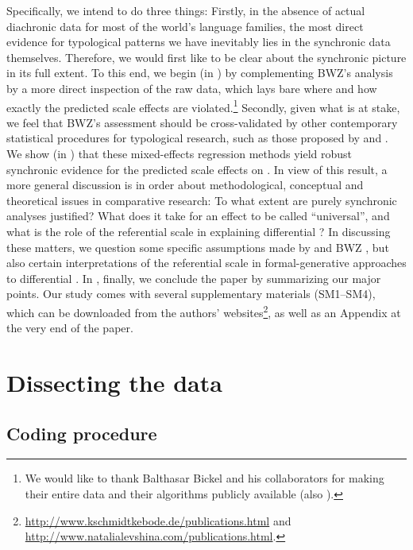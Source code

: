 \documentclass[output=paper]{langscibook}
\begin{document}
Specifically, we intend to do three things: Firstly, in the absence of actual diachronic data for most of the world’s language families, the most direct evidence for typological patterns we have inevitably lies in the synchronic data themselves. Therefore, we would first like to be clear about the synchronic picture in its full extent. To this end, we begin (in ) by complementing BWZ's 
analysis by a more direct inspection of the raw data, which lays bare where and how exactly the predicted scale effects are violated.\footnote{We would like to thank Balthasar Bickel and his collaborators for making their entire data and their algorithms publicly available (\cf also \citealt{Bickeletal2017Autotyp}).} Secondly, given what is at stake, we feel that BWZ's assessment should be cross-validated by other contemporary statistical procedures for typological research, such as those proposed by \citet{Cysouw2010Dealing} and \citet{Jaeger2011Mixed}. We show (in ) that these mixed-effects regression methods yield robust synchronic evidence for the predicted scale effects on . In view of this result, a more general discussion is in order about methodological, conceptual and theoretical issues in comparative research: To what extent are purely synchronic analyses justified? What does it take for an effect to be called “universal”, and what is the role of the referential scale in explaining differential ? In discussing these matters, we question some specific assumptions made by \citet{Sinnemki2014Typological} and  BWZ , but also certain interpretations of the referential scale in formal-generative approaches to differential . In , finally, we conclude the paper by summarizing our major points. Our study comes with several supplementary materials (SM1--SM4), which can be downloaded from the authors’ websites\footnote{\cf \url{http://www.kschmidtkebode.de/publications.html} and \url{http://www.natalialevshina.com/publications.html}.}, as well as an Appendix at the very end of the paper.


\section{Dissecting the data}\label{18-sc-sec:2}
\subsection{Coding procedure}\label{18-sc-subsec:2-1}
\end{document}
